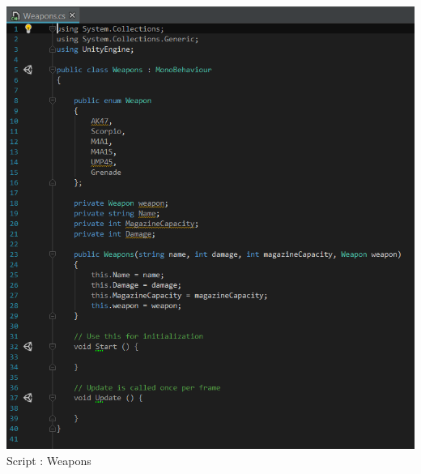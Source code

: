 \documentclass[12pt]{article}
\begin{document}
\begin{center}
    \includegraphics[scale = 0.85]{Script_weapons.PNG}\\[1cm]
    Script : Weapons
    

\end{center}
\end{document}
